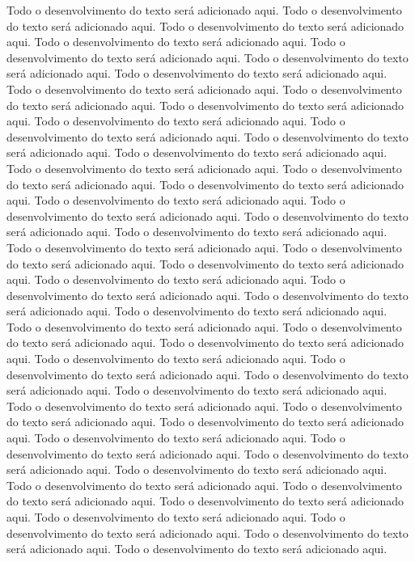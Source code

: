 Todo o desenvolvimento do texto será adicionado aqui.
Todo o desenvolvimento do texto será adicionado aqui.
Todo o desenvolvimento do texto será adicionado aqui.
Todo o desenvolvimento do texto será adicionado aqui.
Todo o desenvolvimento do texto será adicionado aqui.
Todo o desenvolvimento do texto será adicionado aqui.
Todo o desenvolvimento do texto será adicionado aqui.
Todo o desenvolvimento do texto será adicionado aqui.
Todo o desenvolvimento do texto será adicionado aqui.
Todo o desenvolvimento do texto será adicionado aqui.
Todo o desenvolvimento do texto será adicionado aqui.
Todo o desenvolvimento do texto será adicionado aqui.
Todo o desenvolvimento do texto será adicionado aqui.
Todo o desenvolvimento do texto será adicionado aqui.
Todo o desenvolvimento do texto será adicionado aqui.
Todo o desenvolvimento do texto será adicionado aqui.
Todo o desenvolvimento do texto será adicionado aqui.
Todo o desenvolvimento do texto será adicionado aqui.
Todo o desenvolvimento do texto será adicionado aqui.
Todo o desenvolvimento do texto será adicionado aqui.
Todo o desenvolvimento do texto será adicionado aqui.
Todo o desenvolvimento do texto será adicionado aqui.
Todo o desenvolvimento do texto será adicionado aqui.
Todo o desenvolvimento do texto será adicionado aqui.
Todo o desenvolvimento do texto será adicionado aqui.
Todo o desenvolvimento do texto será adicionado aqui.
Todo o desenvolvimento do texto será adicionado aqui.
Todo o desenvolvimento do texto será adicionado aqui.
Todo o desenvolvimento do texto será adicionado aqui.
Todo o desenvolvimento do texto será adicionado aqui.
Todo o desenvolvimento do texto será adicionado aqui.
Todo o desenvolvimento do texto será adicionado aqui.
Todo o desenvolvimento do texto será adicionado aqui.
Todo o desenvolvimento do texto será adicionado aqui.
Todo o desenvolvimento do texto será adicionado aqui.
Todo o desenvolvimento do texto será adicionado aqui.
Todo o desenvolvimento do texto será adicionado aqui.
Todo o desenvolvimento do texto será adicionado aqui.
Todo o desenvolvimento do texto será adicionado aqui.
Todo o desenvolvimento do texto será adicionado aqui.
Todo o desenvolvimento do texto será adicionado aqui.
Todo o desenvolvimento do texto será adicionado aqui.
Todo o desenvolvimento do texto será adicionado aqui.
Todo o desenvolvimento do texto será adicionado aqui.
Todo o desenvolvimento do texto será adicionado aqui.
Todo o desenvolvimento do texto será adicionado aqui.
Todo o desenvolvimento do texto será adicionado aqui.
Todo o desenvolvimento do texto será adicionado aqui.
Todo o desenvolvimento do texto será adicionado aqui.

